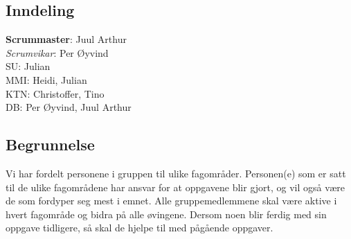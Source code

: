 \subsection{Inndeling}
\textbf{Scrummaster}: Juul Arthur\\
\emph{Scrumvikar}: Per Øyvind\\
SU: Julian\\
MMI: Heidi, Julian\\
KTN: Christoffer, Tino\\
DB: Per Øyvind, Juul Arthur

\subsection{Begrunnelse}
Vi har fordelt personene i gruppen til ulike fagområder. Personen(e) som er satt til de ulike fagområdene har ansvar for at oppgavene blir gjort, og vil også være de som fordyper seg mest i emnet. Alle gruppemedlemmene skal være aktive i hvert fagområde og bidra på alle øvingene. Dersom noen blir ferdig med sin oppgave tidligere, så skal de hjelpe til med pågående oppgaver.